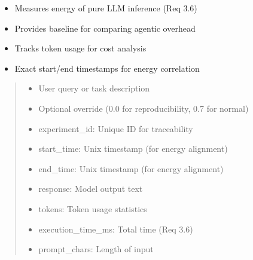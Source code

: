 \documentclass[letterpaper,10pt,english]{sphinxmanual}
\begin{document}
\begin{fulllineitems}
\begin{fulllineitems}
\begin{description}
\begin{itemize}
\item {} 
\sphinxAtStartPar
Measures energy of pure LLM inference (Req 3.6)

\item {} 
\sphinxAtStartPar
Provides baseline for comparing agentic overhead

\item {} 
\sphinxAtStartPar
Tracks token usage for cost analysis

\item {} 
\sphinxAtStartPar
Exact start/end timestamps for energy correlation

\end{itemize}

\end{description}
\begin{quote}\begin{description}
\begin{itemize}
\item {} 
\sphinxAtStartPar
{} \textendash{} User query or task description

\item {} 
\sphinxAtStartPar
{} \textendash{} Optional override (0.0 for reproducibility, 0.7 for normal)

\end{itemize}

\sphinxAtStartPar
\begin{itemize}
\item {} 
\sphinxAtStartPar
experiment\_id: Unique ID for traceability

\item {} 
\sphinxAtStartPar
start\_time: Unix timestamp (for energy alignment)

\item {} 
\sphinxAtStartPar
end\_time: Unix timestamp (for energy alignment)

\item {} 
\sphinxAtStartPar
response: Model output text

\item {} 
\sphinxAtStartPar
tokens: Token usage statistics

\item {} 
\sphinxAtStartPar
execution\_time\_ms: Total time (Req 3.6)

\item {} 
\sphinxAtStartPar
prompt\_chars: Length of input


\end{itemize}
\end{description}
\end{quote}
\end{fulllineitems}
\end{fulllineitems}
\end{document}
